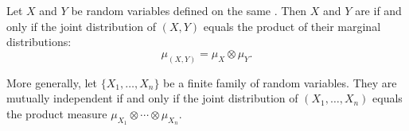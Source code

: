 \begin{proposition} \label{proposition:independence_equals_product_of_distributions}
Let $X$ and $Y$ be random variables defined on the same . Then $X$ and $Y$ are  if and only if the joint distribution of $(X, Y)$ equals the product of their marginal distributions:
$$\mu_{(X,Y)} = \mu_X \otimes \mu_Y.$$

More generally, let $\{X_1, \dots, X_n\}$ be a finite family of random variables. They are mutually independent if and only if the joint distribution of $(X_1, \dots, X_n)$ equals the product measure $\mu_{X_1} \otimes \cdots \otimes \mu_{X_n}$.
\end{proposition}

